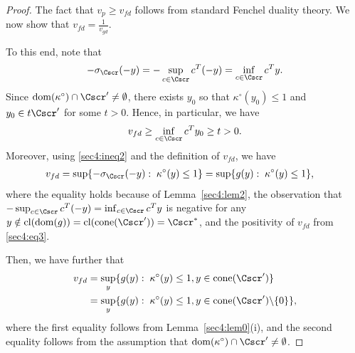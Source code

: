 \documentclass{siamltex}   %
\begin{document}
  \begin{proof}
    The fact that $v_p\ge v_{fd}$ follows from standard Fenchel duality theory. We now show that $v_{fd} = \frac{1}{v_{gd}}$.

    To this end, note that
    \begin{equation}\label{sec4:ineq2}
    -\sigma_\Cscr(-y) = -\sup_{c\in \Cscr} c^T(-y) = \inf_{c\in \Cscr}c^Ty.
    \end{equation}
    Since ${\rm dom}(\kappa^\circ)\cap \Cscr'\neq \emptyset$, there exists $y_0$ so that $\kappa^\circ(y_0)\le 1$
    and $y_0\in t\Cscr'$ for some $t>0$. Hence, in particular, we have
    \begin{equation}\label{sec4:eq3}
    v_{fd}\ge \inf_{c\in \Cscr}c^Ty_0 \ge t > 0.
    \end{equation}
    Moreover, using \eqref{sec4:ineq2} and the definition of $v_{fd}$, we have
    \begin{equation*}
      \begin{split}
        v_{fd} &= \sup\{-\sigma_{\Cscr}(-y):\; \kappa^\circ(y)\le 1\} = \sup\{g(y):\; \kappa^\circ(y)\le 1\},
      \end{split}
    \end{equation*}
    where the equality holds because of Lemma~\ref{sec4:lem2}, the observation that $-\sup_{c\in \Cscr} c^T(-y) = \inf_{c\in \Cscr}c^Ty$ is negative for any $y\notin {\rm cl}({\rm dom}(g)) = {\rm cl}({\rm cone}(\Cscr')) = \Cscr^*$, and the positivity of $v_{fd}$ from \eqref{sec4:eq3}.

    Then, we have further that
    \begin{equation}\label{sec4:vineq}
      \begin{split}
        v_{fd}
        & = \sup_y\{g(y):\; \kappa^\circ(y)\le 1, y \in {\rm cone}(\Cscr')\}\\
        & = \sup_y\{g(y):\; \kappa^\circ(y)\le 1, y \in {\rm cone}(\Cscr')\backslash\{0\}\},\\
      \end{split}
    \end{equation}
    where the first equality follows from Lemma~\ref{sec4:lem0}{\rm (i)}, and the second equality follows from
    the assumption that ${\rm dom}(\kappa^\circ)\cap \Cscr'\neq \emptyset$.


\end{proof}
\end{document}
